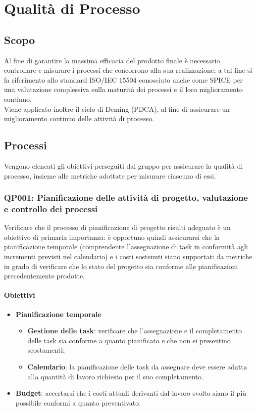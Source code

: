 \chapter{Qualità di Processo}
\label{processo} 
\section{Scopo}
Al fine di garantire la massima efficacia del prodotto finale è necessario controllare e misurare i processi che concorrono alla sua realizzazione; a tal fine si fa riferimento allo standard ISO/IEC 15504 conosciuto anche come SPICE per una valutazione complessiva sulla maturità dei processi e il loro miglioramento continuo.\\
Viene applicato inoltre il ciclo di Deming (PDCA), al fine di assicurare un miglioramento continuo delle attività di processo. 

\section{Processi}\label{processi}
Vengono elencati gli obiettivi perseguiti dal gruppo per assicurare la qualità di processo, insieme alle metriche adottate per misurare ciascuno di essi.
\subsection{QP001: Pianificazione delle attività di progetto, valutazione e controllo dei processi}\label{pro1}
Verificare che il processo di pianificazione di progetto risulti adeguato è un obiettivo di primaria importanza: è opportuno quindi assicurarsi che la pianificazione temporale (comprendente l'assegnazione di task in conformità agli incrementi previsti nel calendario) e i costi sostenuti siano supportati da metriche in grado di verificare che lo stato del progetto sia conforme alle pianificazioni precedentemente prodotte.


\subsubsection{Obiettivi}
\begin{itemize}
	\item \textbf{Pianificazione temporale}
	\begin{itemize}
		\item \textbf{Gestione delle task}: verificare che l'assegnazione e il completamento delle task sia conforme a quanto pianificato e che non si presentino scostamenti;
		\item \textbf{Calendario}: la pianificazione delle task da assegnare deve essere adatta alla quantità di lavoro richiesto per il suo completamento.
	\end{itemize}
	\item \textbf{Budget}: accertarsi che i costi attuali derivanti dal lavoro svolto siano il più possibile conformi a quanto preventivato.
\end{itemize}

